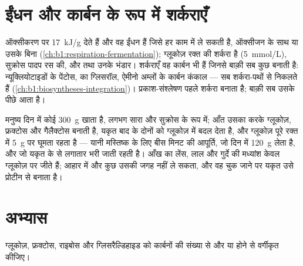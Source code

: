\section{ईंधन और कार्बन के रूप में शर्कराएँ}

\begin{proposition}[ग्लूकोज़ का स्थान]\label{prop:b1:carbohydrates:fuel}
 ऑक्सीकरण पर \qty{17}{kJ/g} देते हैं और वह ईंधन हैं जिसे
हर  काम में ले सकती है, ऑक्सीजन के साथ या उसके बिना
(\cref{ch:b1:respiration-fermentation});
ग्लूकोज़ रक्त की शर्करा है (\qty{5}{mmol/L}), सुक्रोस पादप रस की, और
 तथा  उनके भंडार। शर्कराएँ वह कार्बन भी हैं जिनसे 
बाक़ी सब कुछ बनाती है: न्यूक्लियोटाइडों के पेंटोस,  का ग्लिसरॉल,
ऐमीनो अम्लों के कार्बन कंकाल --- सब शर्करा-पथों से निकलते हैं
(\cref{ch:b1:biosyntheses-integration})।
प्रकाश-संश्लेषण पहले शर्करा बनाता है; बाक़ी सब उसके पीछे आता है।
\end{proposition}

\begin{example}[एक दिन की शर्करा]\label{ex:b1:carbohydrates:day}
मनुष्य दिन में कोई \qty{300}{g}  खाता है, लगभग सारा 
और सुक्रोस के रूप में; आँत उसका  करके ग्लूकोज़, फ्रक्टोस और
गैलैक्टोस बनाती है, यकृत बाद के दोनों को ग्लूकोज़ में बदल देता है, और
ग्लूकोज़ पूरे रक्त में \qty{5}{g} पर घूमता रहता है --- यानी मस्तिष्क के
लिए बीस मिनट की आपूर्ति, जो दिन में \qty{120}{g} लेता है, और जो यकृत के
 से लगातार भरी जाती रहती है। आँख का लेंस, लाल  और गुर्दे
की मध्यांश केवल ग्लूकोज़ पर जीते हैं; आहार में और कुछ उसकी जगह नहीं ले
सकता, और वह चुक जाने पर यकृत उसे प्रोटीन से बनाता है।
\end{example}

\section{अभ्यास}

\begin{exercise}[$\star$]\label{exo:b1:carbohydrates:1}
ग्लूकोज़, फ्रक्टोस, राइबोस और ग्लिसरैल्डिहाइड को कार्बनों की संख्या से
और  या  होने से वर्गीकृत कीजिए।
\end{exercise}

